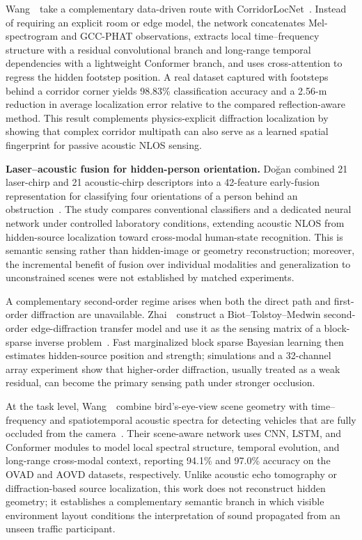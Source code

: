 Wang~\etal~take a complementary data-driven route with CorridorLocNet~\cite{wangCorridorLocNet2026}. Instead of requiring an explicit room or edge model, the network concatenates Mel-spectrogram and GCC-PHAT observations, extracts local time--frequency structure with a residual convolutional branch and long-range temporal dependencies with a lightweight Conformer branch, and uses cross-attention to regress the hidden footstep position. A real dataset captured with footsteps behind a corridor corner yields 98.83\% classification accuracy and a 2.56-m reduction in average localization error relative to the compared reflection-aware method. This result complements physics-explicit diffraction localization by showing that complex corridor multipath can also serve as a learned spatial fingerprint for passive acoustic NLOS sensing.

\vspace{0.8mm}
\noindent \textbf{Laser--acoustic fusion for hidden-person orientation.}
Do\u{g}an combined 21 laser-chirp and 21 acoustic-chirp descriptors into a 42-feature early-fusion representation for classifying four orientations of a person behind an obstruction~\cite{doganLaserAcousticNLOSOrientation2026}. The study compares conventional classifiers and a dedicated neural network under controlled laboratory conditions, extending acoustic NLOS from hidden-source localization toward cross-modal human-state recognition. This is semantic sensing rather than hidden-image or geometry reconstruction; moreover, the incremental benefit of fusion over individual modalities and generalization to unconstrained scenes were not established by matched experiments.

A complementary second-order regime arises when both the direct path and first-order diffraction are unavailable. Zhai~\etal~construct a Biot--Tolstoy--Medwin second-order edge-diffraction transfer model and use it as the sensing matrix of a block-sparse inverse problem~\cite{zhaiSecondOrderAcousticNLOS2025}. Fast marginalized block sparse Bayesian learning then estimates hidden-source position and strength; simulations and a 32-channel array experiment show that higher-order diffraction, usually treated as a weak residual, can become the primary sensing path under stronger occlusion.

At the task level, Wang~\etal~combine bird's-eye-view scene geometry with time--frequency and spatiotemporal acoustic spectra for detecting vehicles that are fully occluded from the camera~\cite{wangAudioVisualNLOS2026}. Their scene-aware network uses CNN, LSTM, and Conformer modules to model local spectral structure, temporal evolution, and long-range cross-modal context, reporting 94.1\% and 97.0\% accuracy on the OVAD and AOVD datasets, respectively. Unlike acoustic echo tomography or diffraction-based source localization, this work does not reconstruct hidden geometry; it establishes a complementary semantic branch in which visible environment layout conditions the interpretation of sound propagated from an unseen traffic participant.

